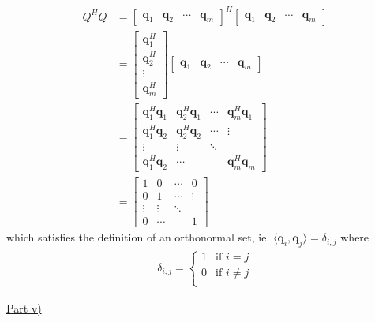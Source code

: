 \documentclass[letterpaper,12pt]{article}
\newcommand{\vect}[1]{\mathbf{#1}}
\begin{document}
\begin{align*}
Q^HQ &=
\begin{bmatrix}
  \vect{q}_1 & \vect{q}_2 & \cdots & \vect{q}_m
\end{bmatrix}^H
\begin{bmatrix}
  \vect{q}_1 & \vect{q}_2 & \cdots & \vect{q}_m
\end{bmatrix} \\ &=
\begin{bmatrix}
  \vect{q}_1^H \\ \vect{q}_2^H \\ \vdots \\ \vect{q}_m^H
\end{bmatrix}
\begin{bmatrix}
  \vect{q}_1 & \vect{q}_2 & \cdots & \vect{q}_m
\end{bmatrix} \\ &=
\begin{bmatrix}
  \vect{q}_1^H \vect{q}_1 & \vect{q}_2^H \vect{q}_1 & \cdots & \vect{q}_m^H \vect{q}_1 \\
  \vect{q}_1^H \vect{q}_2 & \vect{q}_2^H \vect{q}_2 & \cdots & \vdots \\
  \vdots & \vdots & \ddots & \\
  \vect{q}_1^H \vect{q}_2 & \cdots & & \vect{q}_m^H \vect{q}_m
\end{bmatrix} \\ &=
\begin{bmatrix}
  1 & 0 & \cdots & 0 \\
  0 & 1 & \cdots & \vdots \\
  \vdots & \vdots & \ddots & \\
  0 & \cdots & & 1
\end{bmatrix}
\end{align*}
which satisfies the definition of an orthonormal set, ie. $\langle \vect{q}_i, \vect{q}_j \rangle = \delta_{i, j}$ where
\begin{align*}
\delta_{i, j}=
\begin{cases}
1 & \text{if } i = j \\
0 & \text{if } i \neq j \\
\end{cases}
\end{align*}

\underline{Part v)}
\end{document}
